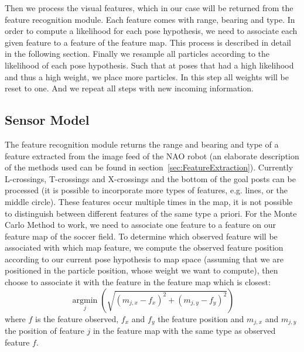 \documentclass[	DIV=calc,%
							paper=a4,%
							fontsize=9pt,%
							twocolumn]{scrartcl}	 					%
\begin{document}
Then we process the visual features, which in our case will be returned from the feature recognition module. Each feature comes with range, bearing and type. In order to compute a likelihood for each pose hypothesis, we need to associate each given feature to a feature of the feature map. This process is described in detail in the following section. Finally we resample all particles according to the likelihood of each pose hypothesis. Such that at poses that had a high likelihood and thus a high weight, we place more particles. In this step all weights will be reset to one. And we repeat all steps with new incoming information.

\subsection{Sensor Model}
\label{sec:SensorModel}
The feature recognition module returns the range and bearing and type of a feature extracted from the image feed of the NAO robot (an elaborate description of the methods used can be found in section~\ref{sec:FeatureExtraction}). Currently L-crossings, T-crossings and X-crossings and the bottom of the goal posts can be processed (it is possible to incorporate more types of features, e.g. lines, or the middle circle). These features occur multiple times in the map, it is not possible to distinguish between different features of the same type a priori. For the Monte Carlo Method to work, we need to associate one feature to a feature on our feature map of the soccer field. To determine which observed feature will be associated with which map feature, we compute the observed feature position according to our current pose hypothesis to map space (assuming that we are positioned in the particle position, whose weight we want to compute), then choose to associate it with the feature in the feature map which is closest:
\[\underset{j}{\operatorname{argmin}}  (\sqrt{(m_{j,x} - f_x)^2 + (m_{j,y} - f_y)^2})   \] 
where $f$ is the feature observed, $f_x$ and $f_y$ the feature position and $m_{j,x}$ and $m_{j,y}$ the position of feature $j$ in the feature map with the same type as observed feature $f$. 
\end{document}
